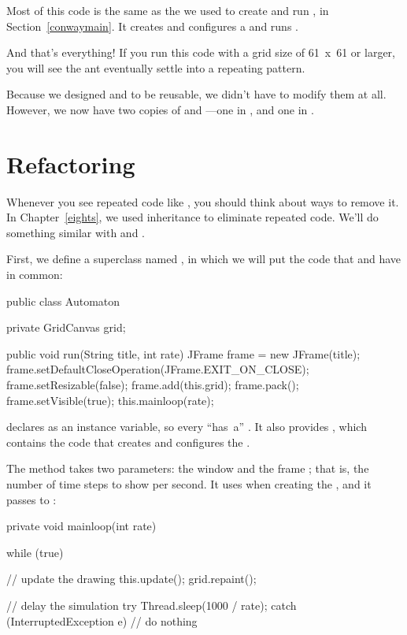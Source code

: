 Most of this code is the same as the  we used to create and run , in Section~\ref{conwaymain}.
It creates and configures a  and runs .

And that's everything!
If you run this code with a grid size of \mbox{61 x 61} or larger, you will see the ant eventually settle into a repeating pattern.

Because we designed  and  to be reusable, we didn't have to modify them at all.
However, we now have two copies of  and ---one in , and one in .


\section{Refactoring}
\label{reusing-classes_refactoring}

Whenever you see repeated code like , you should think about ways to remove it.
In Chapter~\ref{eights}, we used inheritance to eliminate repeated code.
We'll do something similar with  and .

First, we define a superclass named , in which we will put the code that  and  have in common:

\begin{code}
public class Automaton {
    private GridCanvas grid;

    public void run(String title, int rate) {
        JFrame frame = new JFrame(title);
        frame.setDefaultCloseOperation(JFrame.EXIT_ON_CLOSE);
        frame.setResizable(false);
        frame.add(this.grid);
        frame.pack();
        frame.setVisible(true);
        this.mainloop(rate);
    }
}
\end{code}

 declares  as an instance variable, so every  ``has~a'' .
It also provides , which contains the code that creates and configures the .

The  method takes two parameters: the window  and the frame ; that is, the number of time steps to show per second.
It uses  when creating the , and it passes  to :

\begin{code}
private void mainloop(int rate) {
    while (true) {

        // update the drawing
        this.update();
        grid.repaint();

        // delay the simulation
        try {
            Thread.sleep(1000 / rate);
        } catch (InterruptedException e) {
            // do nothing
        }
    }
}
\end{code}

